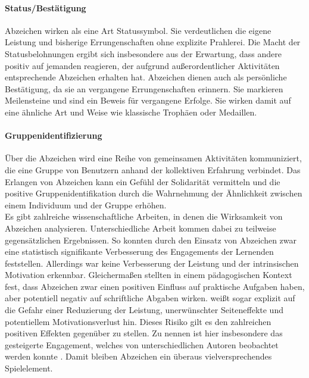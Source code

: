 \paragraph{Status/Bestätigung}
Abzeichen wirken als eine Art Statussymbol. Sie verdeutlichen die eigene Leistung und bisherige Errungenschaften ohne explizite Prahlerei.
Die Macht der Statusbelohnungen ergibt sich insbesondere aus der Erwartung, dass andere positiv auf jemanden reagieren, der aufgrund außerordentlicher Aktivitäten entsprechende Abzeichen erhalten hat. Abzeichen dienen auch als persönliche Bestätigung, da sie an vergangene Errungenschaften erinnern. Sie markieren Meilensteine und sind ein Beweis für vergangene Erfolge. Sie wirken damit auf eine ähnliche Art und Weise wie klassische Trophäen oder Medaillen.

\paragraph{Gruppenidentifizierung}
Über die Abzeichen wird eine Reihe von gemeinsamen Aktivitäten kommuniziert, die eine Gruppe von Benutzern anhand der kollektiven Erfahrung verbindet. Das Erlangen von Abzeichen kann ein Gefühl der Solidarität vermitteln und die positive Gruppenidentifikation durch die Wahrnehmung der Ähnlichkeit zwischen einem Individuum und der Gruppe erhöhen.\\

Es gibt zahlreiche wissenschaftliche Arbeiten, in denen die Wirksamkeit von Abzeichen analysieren. Unterschiedliche Arbeit kommen dabei zu teilweise gegensätzlichen Ergebnissen. So konnten  durch den Einsatz von Abzeichen zwar eine statistisch signifikante Verbesserung des Engagements der Lernenden feststellen. Allerdings war keine Verbesserung der Leistung und der intrinsischen Motivation erkennbar. Gleichermaßen stellten  in einem pädagogischen Kontext fest, dass Abzeichen zwar einen positiven Einfluss auf praktische Aufgaben haben, aber potentiell negativ auf schriftliche Abgaben wirken.  weißt sogar explizit auf die Gefahr einer Reduzierung der Leistung, unerwünschter Seiteneffekte und potentiellem Motivationsverlust hin. Dieses Risiko gilt es den zahlreichen positiven Effekten gegenüber zu stellen. Zu nennen ist hier insbesondere das gesteigerte Engagement, welches von unterschiedlichen Autoren beobachtet werden konnte \cite{ortiz_gamification_2017, dominguez_gamifying_2013, hamari_badges_2017, hamzah_influence_2015}. Damit bleiben Abzeichen ein überaus vielversprechendes Spielelement. 


